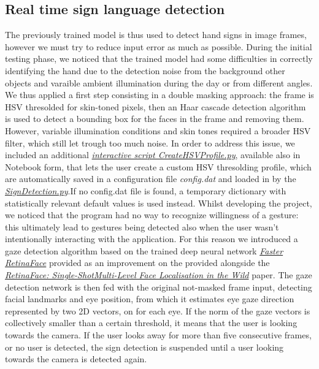 \documentclass[a4paper, 12pt]{article}
\begin{document}
\subsection{Real time sign language detection}
\label{RTSignDetect}
The previously trained model is thus used to detect hand signs in image frames, however we must try to reduce input error as much as possible.
During the initial testing phase, we noticed that the trained model had some difficulties in correctly identifying the hand due to the detection noise from the background other objects and varaible ambient illumination during the day or from different angles. We thus applied a first step consisting in a double masking approach: the frame is HSV thresolded for skin-toned pixels, then an Haar cascade detection algorithm is used to detect a bounding box for the faces in the frame and removing them.\linebreak
However, variable illumination conditions and skin tones required a broader HSV filter, which still let trough too much noise. In order to address this issue, we included an additional \textit{\hyperref[https://github.com/MarzioVallero/Real-time-Sign-Language-Detection/blob/master/CreateHSVProfile.py]{interactive script CreateHSVProfile.py}}, available also in Notebook form, that lets the user create a custom HSV thresolding profile, which are automatically saved in a configuration file \textit{config.dat} and loaded in by the \textit{\hyperref[https://github.com/MarzioVallero/Real-time-Sign-Language-Detection/blob/master/SignDetection.py]{SignDetection.py}}.If no config.dat file is found, a temporary dictionary with statistically relevant default values is used instead.\linebreak
Whilst developing the project, we noticed that the program had no way to recognize willingness of a gesture: this ultimately lead to gestures being detected also when the user wasn't intentionally interacting with the application. For this reason we introduced a gaze detection algorithm based on the trained deep neural network \textit{\hyperref[Ref12]{Faster RetinaFace}} provided as an improvement on the provided alongside the \textit{\hyperref[Ref4]{RetinaFace: Single-ShotMulti-Level Face Localisation in the Wild}} paper.
The gaze detection network is then fed with the original not-masked frame input, detecting facial landmarks and eye position, from which it estimates eye gaze direction represented by two 2D vectors, on for each eye. If the norm of the gaze vectors is collectively smaller than a certain threshold, it means that the user is looking towards the camera. If the user looks away for more than five consecutive frames, or no user is detected, the sign detection is suspended until a user looking towards the camera is detected again.\linebreak
\end{document}
